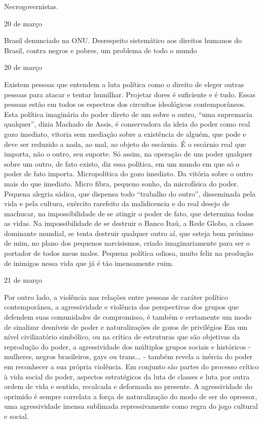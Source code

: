 Necrogovernistas.

20 de março

Brasil denunciado na ONU. Desrespeito sistemático aos direitos humanos
do Brasil, contra negros e pobres, um problema de todo o mundo

20 de março

Existem pessoas que entendem a luta política como o direito de eleger
outras pessoas para atacar e tentar humilhar. Projetar dores é
suficiente e é tudo. Essas pessoas estão em todos os espectros dos
circuitos ideológicos contemporâneos. Esta política imaginária do poder
direto de um sobre o outro, ``uma supremacia qualquer'', dizia Machado
de Assis, é conservadora da ideia do poder como real gozo imediato,
vitoria sem mediação sobre a existência de alguém, que pode e deve ser
reduzido a nada, ao mal, ao objeto do escárnio. É o escárnio real que
importa, não o outro, seu suporte. Só assim, na operação de um poder
qualquer sobre um outro, de fato existo, diz essa política, em um mundo
em que só o poder de fato importa. Micropolítica do gozo imediato. Da
vitória sobre o outro mais do que imediato. Micro fibra, pequeno sonho,
da microfísica do poder. Pequena alegria sádica, que dispensa todo
``trabalho do outro'', disseminada pela vida e pela cultura, exército
rarefeito da malidicencia e do real desejo de machucar, na
impossibilidade de se atingir o poder de fato, que determina todas as
vidas. Na impossibilidade de se destruir o Banco Itaú, a Rede Globo, a
classe dominante mundial, se tenta destruir qualquer outro aí, que
esteja bem próximo de mim, no plano dos pequenos narcisismos, criado
imaginariamente para ser o portador de todos meus males. Pequena
política odiosa, muito feliz na produção de inimigos nessa vida que já é
tão imensamente ruim.

21 de março

Por outro lado, a violência nas relações entre pessoas de caráter
político contemporânea, a agressividade e violência das perspectivas dos
grupos que defendem suas comunidades de compromisso, é também e
certamente um modo de sinalizar desníveis de poder e naturalizações de
gozos de privilégios Em um nível civilizatório simbólico, ou na crítica
de estruturas que são objetivas da reprodução do poder, a agressividade
dos múltiplos grupos sociais e históricos - mulheres, negros
brasileiros, gays ou trans... - também revela a inércia do poder em
reconhecer a sua própria violência. Em conjunto são partes do processo
crítico à vida social do poder, aspectos estratégicos da luta de classes
e luta por outra ordem de vida e sentido, recalcada e deformada no
presente. A agressividade do oprimido é sempre correlata a força de
naturalização do modo de ser do opressor, uma agressividade imensa
sublimada repressivamente como regra do jogo cultural e social.

